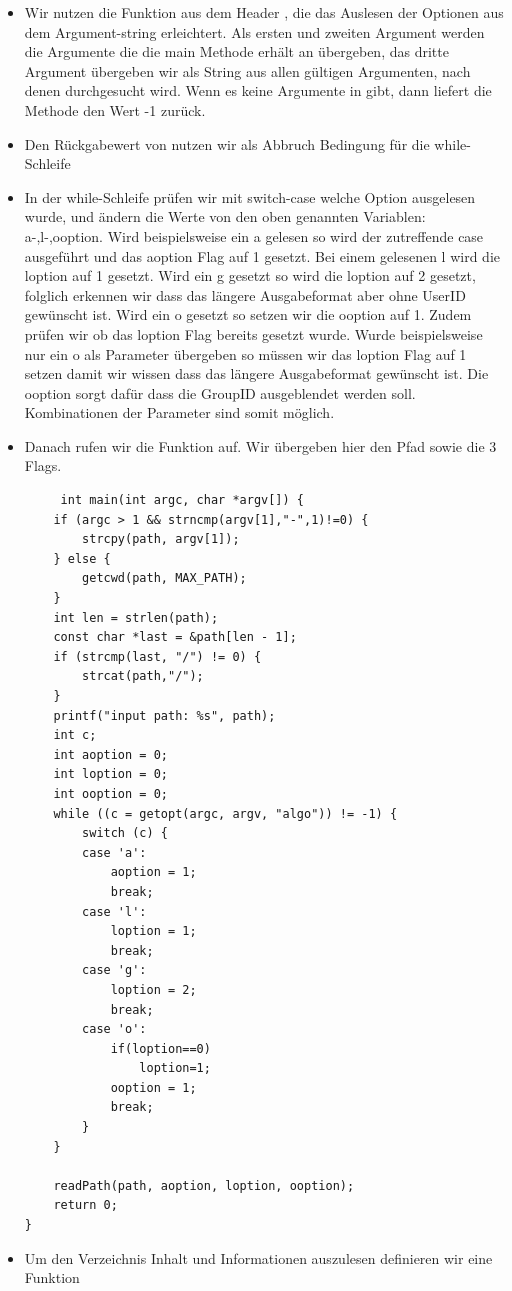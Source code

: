 \begin{itemize}
\item Wir nutzen die Funktion  aus dem Header ,
die das Auslesen der Optionen aus dem Argument-string erleichtert. Als ersten und zweiten Argument
werden die Argumente die die main Methode erhält an  übergeben,
das dritte Argument übergeben wir als String aus allen gültigen Argumenten,
nach denen durchgesucht wird.
Wenn es keine Argumente in  gibt, dann liefert die Methode den Wert -1 zurück.
\item Den Rückgabewert von  nutzen wir als Abbruch Bedingung für die while-Schleife

\item In der while-Schleife prüfen wir mit switch-case welche Option ausgelesen wurde,
und ändern die Werte von den oben genannten Variablen: a-,l-,ooption.
Wird beispielsweise ein a gelesen so wird der zutreffende case ausgeführt
und das aoption Flag auf 1 gesetzt.
Bei einem gelesenen l wird die loption auf 1 gesetzt.
Wird ein g gesetzt so wird die loption auf 2 gesetzt, folglich erkennen wir
dass das längere Ausgabeformat aber ohne UserID gewünscht ist.
Wird ein o gesetzt so setzen wir die ooption auf 1. Zudem prüfen wir
ob das loption Flag bereits gesetzt wurde. Wurde beispielsweise nur ein
o als Parameter übergeben so müssen wir das loption Flag auf 1 setzen damit
wir wissen dass das längere Ausgabeformat gewünscht ist.
Die ooption sorgt dafür dass die GroupID ausgeblendet werden soll.
Kombinationen der Parameter sind somit möglich.
\item Danach rufen wir die Funktion 
auf. Wir übergeben hier den Pfad sowie die 3 Flags.

 \begin{lstlisting}
	 int main(int argc, char *argv[]) {
	if (argc > 1 && strncmp(argv[1],"-",1)!=0) {
		strcpy(path, argv[1]);
	} else {
		getcwd(path, MAX_PATH);
	}
	int len = strlen(path);
	const char *last = &path[len - 1];
	if (strcmp(last, "/") != 0) {
		strcat(path,"/");
	}
	printf("input path: %s", path);
	int c;
	int aoption = 0;
	int loption = 0;
	int ooption = 0;
	while ((c = getopt(argc, argv, "algo")) != -1) {
		switch (c) {
		case 'a':
			aoption = 1;
			break;
		case 'l':
			loption = 1;
			break;
		case 'g':
			loption = 2;
			break;
		case 'o':
			if(loption==0)
				loption=1;
			ooption = 1;
			break;
		}
	}

	readPath(path, aoption, loption, ooption);
	return 0;
}
 \end{lstlisting}
\item Um den Verzeichnis Inhalt und Informationen auszulesen definieren wir eine Funktion


\end{itemize}
